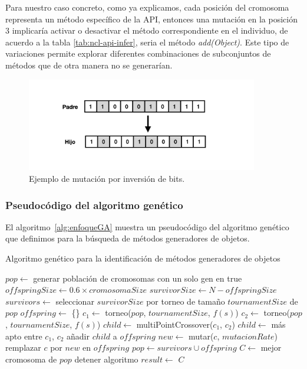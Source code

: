 Para nuestro caso concreto, como ya explicamos, cada posición del cromosoma representa un método específico de la API, entonces una mutación en la posición 3 implicaría activar o desactivar el método
correspondiente en el individuo, de acuerdo a la tabla \ref{tab:ncl-api-infer}, seria el método \emph{add(Object)}.
Este tipo de variaciones permite explorar diferentes combinaciones de subconjuntos de métodos que de otra manera no se generarían.  

\begin{figure}
    \centering
    \includegraphics[width=0.9\textwidth]{images/mutation.png}
    \caption{Ejemplo de mutación por inversión de bits.}
    \label{fig:mutation}
    \end{figure}
\subsubsection{Pseudocódigo del algoritmo genético}

El algoritmo~\ref{alg:enfoqueGA} muestra un pseudocódigo del algoritmo genético que definimos para la búsqueda de métodos generadores de objetos.


\begin{algorithm}
  \caption{Algoritmo genético para la identificación de métodos generadores de
  objetos}
  \label{alg:enfoqueGA}
  \begin{algorithmic}[1]
  \STATE $pop \gets$ generar población de cromosomas con un solo gen en true
  \STATE $offspringSize \gets 0.6 \times cromosomaSize$
  \STATE $survivorSize \gets N - offspringSize$
      \STATE $survivors \gets$ seleccionar $survivorSize$ por torneo de tamaño $tournamentSize$ de $pop$
      \STATE $offspring \gets$ \{\}
          \STATE $c_1 \gets$ torneo($pop$, $tournamentSize$, $f(s)$)
          \STATE $c_2 \gets$ torneo($pop$, $tournamentSize$, $f(s)$)
            \STATE $child \gets$ multiPointCrossover($c_1$, $c_2$)
          \ELSE
            \STATE $child \gets$ más apto entre $c_1$, $c_2$
          \ENDIF
          \STATE añadir $child$ a $offspring$
      \ENDFOR
          \STATE $new \gets$ mutar($c$, $mutacionRate$)
            \STATE remplazar $c$ por $new$ en $offspring$
          \ENDIF
      \ENDFOR
    \STATE $pop \gets survivors \cup offspring$
    \STATE $C \gets$ mejor cromosoma de $pop$
        \STATE detener algoritmo
    \ENDIF
  \ENDFOR
\STATE $result \gets$ $C$


\end{algorithmic}
\end{algorithm}


